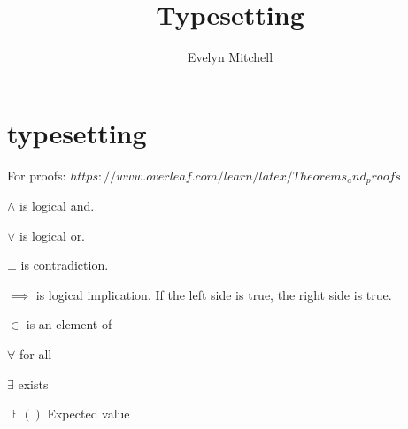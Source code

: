 \documentclass[]{scrartcl}
\title{Typesetting}
\author{Evelyn Mitchell}
\DeclareMathOperator{\EX}{\mathbb{E}}%
\begin{document}
\maketitle

\begin{abstract}

\end{abstract}

\section{typesetting}

For proofs: $https://www.overleaf.com/learn/latex/Theorems_and_proofs$

$\land$ is logical and.

$\lor$ is logical or.

$\bot$ is contradiction.

$\implies$ is logical implication. If the left side is true, the right side is true.

$\in$ is an element of

$\forall$ for all

$\exists$ exists

$\EX()$ Expected value
\end{document}
